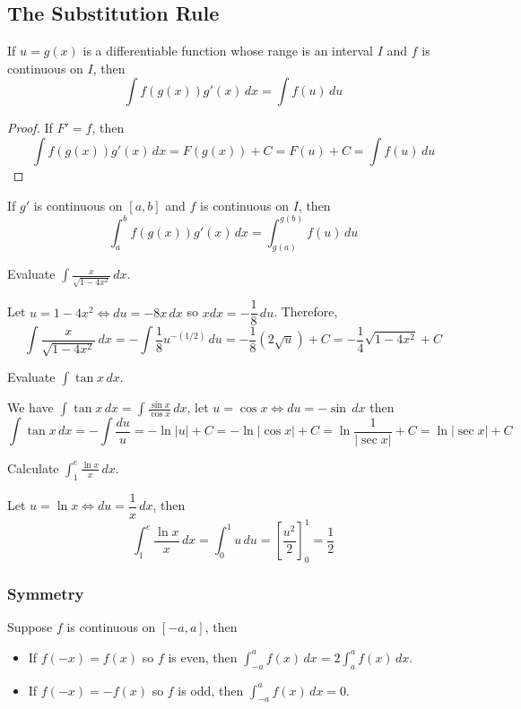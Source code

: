 \subsection{The Substitution Rule}

\begin{theorem}
    If \(u=g(x)\) is a differentiable function whose range is an interval
    \(I\) and \(f\) is continuous on \(I\), then
    \[\int f(g(x))g'(x)\,dx=\int f(u)\,du\]
\end{theorem}
\begin{proof}
    If \(F'=f\), then
    \[\int f(g(x))g'(x)\,dx=F(g(x))+C=F(u)+C=\int f(u)\,du\]
\end{proof}
If \(g'\) is continuous on \([a,b]\) and \(f\) is continuous on \(I\),
then
\[\int_a^b f(g(x))g'(x)\,dx=\int_{g(a)}^{g(b)} f(u)\,du\]

\begin{problem}
    Evaluate \(\displaystyle{\int\frac{x}{\sqrt{1-4x^2}}\,dx}\).
\end{problem}
\begin{solution}
    Let \(u=1-4x^2\iff du=-8x\,dx\) so \(xdx=-\dfrac{1}{8}\,du\).
    Therefore,
    \[\int\frac{x}{\sqrt{1-4x^2}}\,dx=-\int\frac{1}{8}u^{-(1/2)}\,du
    =-\frac{1}{8}(2\sqrt{u})+C=-\frac{1}{4}\sqrt{1-4x^2}+C\]
\end{solution}
\begin{problem}
    Evaluate \(\displaystyle{\int\tan x\,dx}\).
\end{problem}
\begin{solution}
    We have \(\displaystyle{\int\tan x\,dx=\int\frac{\sin x}{\cos x}}\,dx\),
    let \(u=\cos x \iff du=-\sin\,dx\) then
    \[\int\tan x\,dx=-\int\frac{du}{u}=-\ln|u|+C=-\ln|\cos x|+C
    =\ln\frac{1}{|\sec x|}+C=\ln|\sec x|+C\]
\end{solution}
\begin{problem}
    Calculate \(\displaystyle{\int_1^e \frac{\ln x}{x}\,dx}\).
\end{problem}
\begin{solution}
    Let \(u=\ln x\iff du=\dfrac{1}{x}\,dx\), then
    \[\int_1^e \frac{\ln x}{x}\,dx=\int_0^1 u\,du
    =\left[\frac{u^2}{2}\right]_0^1=\frac{1}{2}\]
\end{solution}

\subsubsection*{Symmetry}
\begin{theorem}
    Suppose \(f\) is continuous on \([-a,a]\), then
    \begin{itemize}
        \item If \(f(-x)=f(x)\) so \(f\) is even, then
        \(\displaystyle{\int_{-a}^a f(x)\,dx=2\int_a^a f(x)\,dx}\).
        \item If \(f(-x)=-f(x)\) so \(f\) is odd, then
        \(\displaystyle{\int_{-a}^a f(x)\,dx=0}\).
    \end{itemize}
\end{theorem}